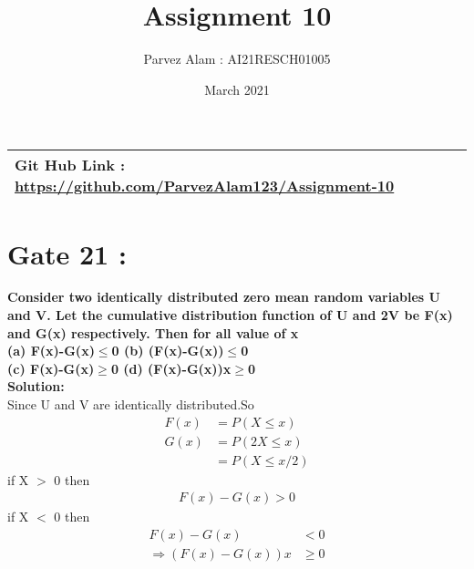 \documentclass{article}
\title{Assignment 10}
\author{Parvez Alam : AI21RESCH01005 }
\date{March 2021}
\begin{document}
\maketitle
\begin{multicols}{2}
\begin{center}
    \begin{tabular}{|p{5cm}|}
    \hline
         Git Hub Link : \url{https://github.com/ParvezAlam123/Assignment-10} \\
    \hline
    \end{tabular}
\end{center}


\section{Gate 21 :}
\textbf{Consider two identically distributed zero mean random variables U and V. Let the cumulative distribution function of U and 2V be F(x) and G(x) respectively. Then for all value of x  \\
(a) F(x)-G(x)\(\leq\)0  (b) (F(x)-G(x))\(\leq\)0 \\
(c) F(x)-G(x)\(\geq\)0  (d) (F(x)-G(x))x\(\geq\)0} \\
\textbf{Solution: } \\
Since U and V are identically distributed.So
\begin{align}
    F(x) &= P(X\leq x) \nonumber \\
    G(x) &= P(2X\leq x) \nonumber \\
         &= P(X \leq x/2) \nonumber
\end{align}
if X \(>\) 0 then 
\begin{align}
    F(x)-G(x)>0 \nonumber
\end{align}
if X \(<\) 0 then
\begin{align}
    F(x)-G(x)&<0 \nonumber \\
    \Rightarrow (F(x)-G(x))x& \geq 0 \nonumber 
\end{align}



\end{multicols}
\end{document}
